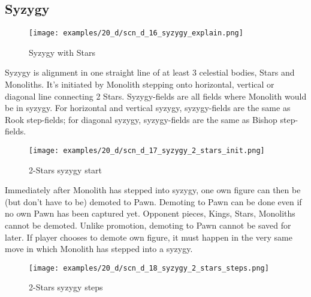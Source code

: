 \clearpage %

\subsection*{Syzygy}

\vspace*{-1.2\baselineskip}
\noindent
\begin{figure}[!h]
\texttt{[image: examples/20\_d/scn\_d\_16\_syzygy\_explain.png]}
\caption{Syzygy with Stars}
\label{fig:scn_d_16_syzygy_explain}
\end{figure}

Syzygy is alignment in one straight line of at least 3 celestial bodies, Stars and Monoliths. It's initiated by
Monolith stepping onto horizontal, vertical or diagonal line connecting 2 Stars. Syzygy-fields are all fields
where Monolith would be in syzygy. For horizontal and vertical syzygy, syzygy-fields are the same as Rook
step-fields; for diagonal syzygy, syzygy-fields are the same as Bishop step-fields.

\clearpage %

\noindent
\begin{figure}[!h]
\texttt{[image: examples/20\_d/scn\_d\_17\_syzygy\_2\_stars\_init.png]}
\caption{2-Stars syzygy start}
\label{fig:scn_d_17_syzygy_2_stars_init}
\end{figure}

Immediately after Monolith has stepped into syzygy, one own figure can then be (but don't have to be) demoted
to Pawn. Demoting to Pawn can be done even if no own Pawn has been captured yet. Opponent pieces, Kings, Stars,
Monoliths cannot be demoted. Unlike promotion, demoting to Pawn cannot be saved for later. If player chooses to
demote own figure, it must happen in the very same move in which Monolith has stepped into a syzygy.

\clearpage %

\noindent
\begin{figure}[!h]
\texttt{[image: examples/20\_d/scn\_d\_18\_syzygy\_2\_stars\_steps.png]}
\caption{2-Stars syzygy steps}
\label{fig:scn_d_18_syzygy_2_stars_steps}
\end{figure}

